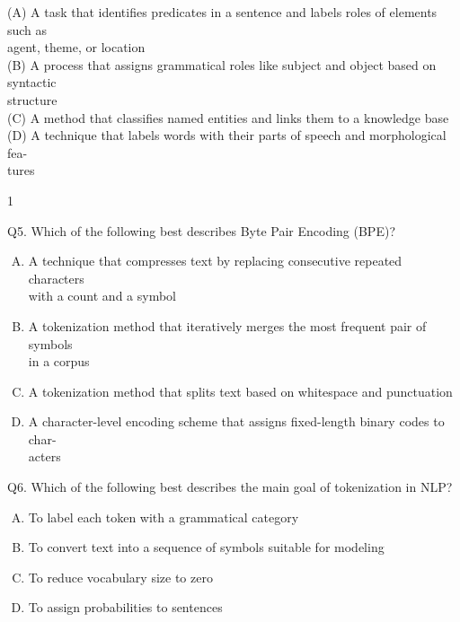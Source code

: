 \documentclass[11pt]{article}
\begin{document}
\noindent (A) A task that identifies predicates in a sentence and labels roles of elements such as\\
\hspace*{1.5em}agent, theme, or location\\
(B) A process that assigns grammatical roles like subject and object based on syntactic\\
\hspace*{1.5em}structure\\
(C) A method that classifies named entities and links them to a knowledge base\\
(D) A technique that labels words with their parts of speech and morphological fea-\\
\hspace*{1.5em}tures

\begin{center}
1
\end{center}

\clearpage

Q5. Which of the following best describes Byte Pair Encoding (BPE)?

\begin{enumerate}[(A)]
\item A technique that compresses text by replacing consecutive repeated characters\\
with a count and a symbol
\item A tokenization method that iteratively merges the most frequent pair of symbols\\
in a corpus
\item A tokenization method that splits text based on whitespace and punctuation
\item A character-level encoding scheme that assigns fixed-length binary codes to char-\\
acters
\end{enumerate}

Q6. Which of the following best describes the main goal of tokenization in NLP?

\begin{enumerate}[(A)]
\item To label each token with a grammatical category
\item To convert text into a sequence of symbols suitable for modeling
\item To reduce vocabulary size to zero
\item To assign probabilities to sentences
\end{enumerate}
\end{document}
